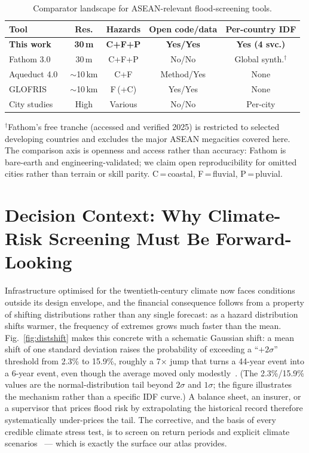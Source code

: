 \documentclass[11pt,a4paper]{article}
\begin{document}
\begin{table}[t]
\centering
\caption{Comparator landscape for ASEAN-relevant flood-screening tools.}
\label{tab:landscape}
\small
\begin{tabular}{@{}lcccc@{}}
\toprule
Tool                                    & Res.           & Hazards        & Open code/data   & Per-country IDF \\
\midrule
\textbf{This work}                      & \textbf{30\,m} & \textbf{C+F+P} & \textbf{Yes/Yes} & \textbf{Yes (4 svc.)} \\
Fathom 3.0~\cite{wing2024}              & 30\,m          & C+F+P          & No/No            & Global synth.$^{\dag}$ \\
Aqueduct 4.0~\cite{hofste2019,ward2020} & $\sim$10\,km   & C+F            & Method/Yes       & None \\
GLOFRIS~\cite{sutanudjaja2018}          & $\sim$10\,km   & F\,(+C)        & Yes/Yes          & None \\
City studies                            & High           & Various        & No/No            & Per-city \\
\bottomrule
\end{tabular}

\vspace{3pt}
{\footnotesize $^{\dag}$Fathom's free tranche (accessed and verified 2025) is restricted to selected developing countries and excludes the major ASEAN megacities covered here. The comparison axis is openness and access rather than accuracy: Fathom is bare-earth and engineering-validated; we claim open reproducibility for omitted cities rather than terrain or skill parity. C\,=\,coastal, F\,=\,fluvial, P\,=\,pluvial.}
\end{table}

\section{Decision Context: Why Climate-Risk Screening Must Be Forward-Looking}
\label{sec:context}
Infrastructure optimised for the twentieth-century climate now faces conditions outside its design envelope, and the financial consequence follows from a property of shifting distributions rather than any single forecast: as a hazard distribution shifts warmer, the frequency of extremes grows much faster than the mean. Fig.~\ref{fig:distshift} makes this concrete with a schematic Gaussian shift: a mean shift of one standard deviation raises the probability of exceeding a ``$+2\sigma$'' threshold from 2.3\% to 15.9\%, roughly a 7$\times$ jump that turns a 44-year event into a 6-year event, even though the average moved only modestly~\cite{patel2024}. (The 2.3\%/15.9\% values are the normal-distribution tail beyond $2\sigma$ and $1\sigma$; the figure illustrates the mechanism rather than a specific IDF curve.) A balance sheet, an insurer, or a supervisor that prices flood risk by extrapolating the historical record therefore systematically under-prices the tail. The corrective, and the basis of every credible climate stress test, is to screen on return periods and explicit climate scenarios~\cite{ngfs2021} --- which is exactly the surface our atlas provides.
\end{document}
